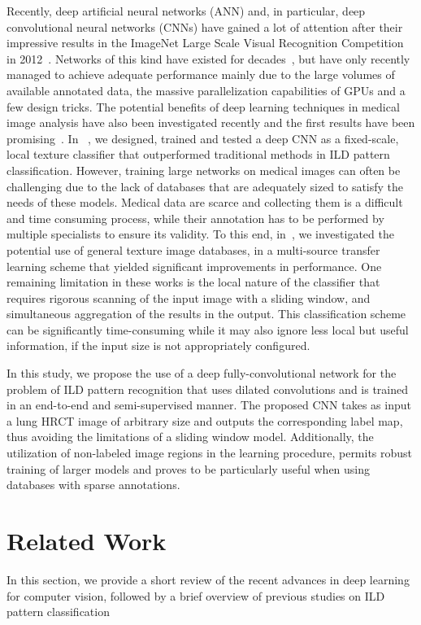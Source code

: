\documentclass[journal]{IEEEtran}
\begin{document}
Recently, deep artificial neural networks (ANN) and, in particular, deep convolutional neural networks (CNNs) have gained a lot of attention after their impressive results in the ImageNet Large Scale Visual Recognition Competition in 2012~\cite{ILSVRC15}. Networks of this kind have existed for decades~\cite{lecun98}, but have only recently managed to achieve adequate performance mainly due to the large volumes of available annotated data, the  massive parallelization capabilities of GPUs and a few design tricks. The potential benefits of deep learning techniques in medical image analysis have also been investigated recently and the first results have been promising~\cite{greenspan2016tmiguest}. In~\cite{AnthimoTMI} , we designed, trained and tested a deep CNN as a fixed-scale, local texture classifier that outperformed traditional methods in ILD pattern classification. However, training large networks on medical images can often be challenging due to the lack of databases that are adequately sized to satisfy the needs of these models. Medical data are scarce and collecting them is a difficult and time consuming process, while their annotation has to be performed by multiple specialists to ensure its validity. To this end, in~\cite{christodoulidis2017multi}, we investigated the potential use of general texture image databases, in a multi-source transfer learning scheme that yielded significant improvements in performance. One remaining limitation in these works is the local nature of the classifier that requires rigorous scanning of the input image with a sliding window, and simultaneous aggregation of the results in the output. This classification scheme can be significantly time-consuming while it may also ignore less local but useful information, if the input size is not appropriately configured.

In this study, we propose the use of a deep fully-convolutional network for the problem of ILD pattern recognition that uses dilated convolutions and is trained in an end-to-end and semi-supervised manner. The proposed CNN takes as input a lung HRCT image of arbitrary size and outputs the corresponding label map, thus avoiding the limitations of a sliding window model. Additionally, the utilization of non-labeled image regions in the learning procedure, permits robust training of larger models and proves to be particularly useful when using databases with sparse annotations.

\section{Related Work}%
In this section, we provide a short review of the recent advances in deep learning for computer vision, followed by a brief overview of previous studies on ILD pattern classification
\end{document}
